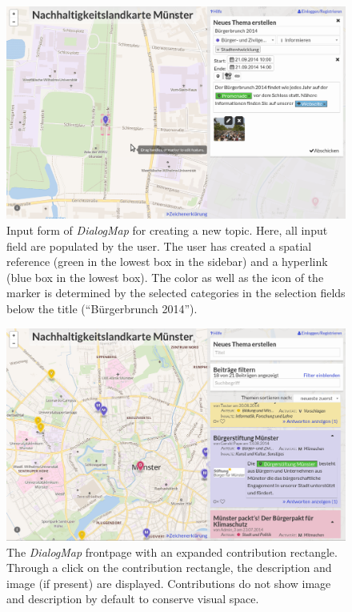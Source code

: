 \begin{figure}[!h]
    \centering
    \includegraphics[width=1\columnwidth]{images/screenshot_create}
    \caption{Input form of \textit{DialogMap} for creating a new topic. Here, all input field are populated by the user. The user has created a spatial reference (green in the lowest box in the sidebar) and a hyperlink (blue box in the lowest box). The color as well as the icon of the marker is determined by the selected categories in the selection fields below the title (``Bürgerbrunch 2014'').}
    \label{fig:screenshot_create}
\end{figure}


\begin{figure}[!h]
    \centering
    \includegraphics[width=1\columnwidth]{images/screenshot_expanded}
    \caption{The \textit{DialogMap} frontpage with an expanded contribution rectangle. Through a click on the contribution rectangle, the description and image (if present) are displayed. Contributions do not show image and description by default to conserve visual space.}
    \label{fig:screenshot_expanded}
\end{figure}



